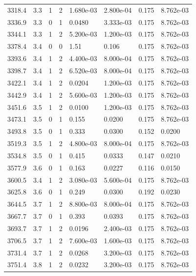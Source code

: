 \documentclass[preview]{standalone}
\begin{document}
{{{{{{{\begin{tabular}{L{1.2cm}C{1.2cm} C{0.3cm}C{0.5cm} C{1.4cm}C{1.4cm} C{1.4cm}C{1.4cm}}
  3318.4  &   3.3  & 1     &  2 &  1.680e-03  & 2.800e-04  & 0.175 &  8.762e-03   \\ 
  3336.9  &   3.3  & 0     &  1 &  0.0480  & 3.333e-03  & 0.175 &  8.762e-03   \\ 
  3344.1  &   3.3  & 1     &  2 &  5.200e-03  & 1.200e-03  & 0.175 &  8.762e-03   \\ 
  3378.4  &   3.4  & 0     &  0 &  1.51  & 0.106  & 0.175 &  8.762e-03   \\ 
  3393.6  &   3.4  & 1     &  2 &  4.400e-03  & 8.000e-04  & 0.175 &  8.762e-03   \\ 
  3398.7  &   3.4  & 1     &  2 &  6.520e-03  & 8.000e-04  & 0.175 &  8.762e-03   \\ 
  3422.1  &   3.4  & 1     &  2 &  0.0204  & 1.200e-03  & 0.175 &  8.762e-03   \\ 
  3442.9  &   3.4  & 1     &  2 &  5.600e-03  & 1.200e-03  & 0.175 &  8.762e-03   \\ 
  3451.6  &   3.5  & 1     &  2 &  0.0100  & 1.200e-03  & 0.175 &  8.762e-03   \\ 
  3473.1  &   3.5  & 0     &  1 &  0.155  & 0.0200  & 0.175 &  8.762e-03   \\ 
  3493.8  &   3.5  & 0     &  1 &  0.333  & 0.0300  & 0.152 &  0.0200   \\ 
  3519.3  &   3.5  & 1     &  2 &  4.800e-03  & 8.000e-04  & 0.175 &  8.762e-03   \\ 
  3534.8  &   3.5  & 0     &  1 &  0.415  & 0.0333  & 0.147 &  0.0210   \\ 
  3577.9  &   3.6  & 0     &  1 &  0.163  & 0.0227  & 0.116 &  0.0150   \\ 
  3600.5  &   3.4  & 1     &  2 &  3.080e-03  & 5.600e-04  & 0.175 &  8.762e-03   \\ 
  3625.8  &   3.6  & 0     &  1 &  0.249  & 0.0300  & 0.192 &  0.0230   \\ 
  3644.5  &   3.7  & 1     &  2 &  8.800e-03  & 8.000e-04  & 0.175 &  8.762e-03   \\ 
  3667.7  &   3.7  & 0     &  1 &  0.393  & 0.0393  & 0.175 &  8.762e-03   \\ 
  3693.7  &   3.7  & 1     &  2 &  0.0196  & 2.400e-03  & 0.175 &  8.762e-03   \\ 
  3706.5  &   3.7  & 1     &  2 &  7.600e-03  & 1.600e-03  & 0.175 &  8.762e-03   \\ 
  3731.4  &   3.7  & 1     &  2 &  0.0268  & 3.200e-03  & 0.175 &  8.762e-03   \\ 
  3751.4  &   3.8  & 1     &  2 &  0.0232  & 3.200e-03  & 0.175 &  8.762e-03   \\ 

\end{tabular}}}}}}}}
\end{document}
